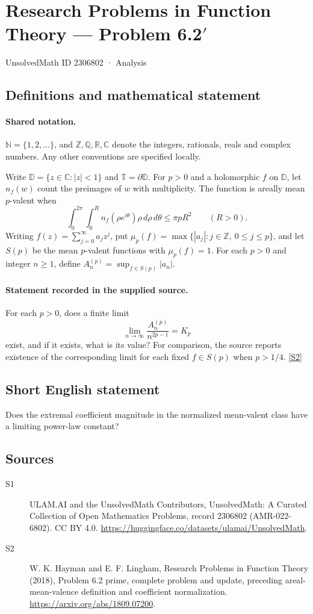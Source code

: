 \documentclass[11pt]{article}
\newcommand{\sref}[2]{\hyperlink{source:#1:#2}{[S#2]}}
\begin{document}
\setcounter{section}{2306801}
\section{Research Problems in Function Theory — Problem 6.2$\prime$}\label{2306802}
{\small\sffamily UnsolvedMath ID 2306802 · Analysis}
\subsection{Definitions and mathematical statement}

\paragraph{Shared notation.}$\mathbb N=\{1,2,\ldots\}$, and $\mathbb Z,\mathbb Q,\mathbb R,\mathbb C$ denote the integers, rationals, reals and complex numbers. Any other conventions are specified locally.


Write $\mathbb D=\{z\in\mathbb C:|z|<1\}$ and $\mathbb T=\partial\mathbb D$. For $p>0$ and a holomorphic $f$ on $\mathbb D$, let $n_f(w)$ count the preimages of $w$ with multiplicity. The function is areally mean $p$-valent when
\[\int_0^{2\pi}\int_0^R n_f(\rho e^{i\theta})\rho\,d\rho\,d\theta\leq\pi pR^2\qquad(R>0).\]
Writing $f(z)=\sum_{j=0}^{\infty}a_jz^j$, put $\mu_p(f)=\max\{|a_j|:j\in\mathbb Z,\ 0\leq j\leq p\}$, and let $S(p)$ be the mean $p$-valent functions with $\mu_p(f)=1$.
For each $p>0$ and integer $n\geq1$, define $A_n^{(p)}=\sup_{f\in S(p)}|a_n|$.
\paragraph{Statement recorded in the supplied source.}
For each $p>0$, does a finite limit
\[\lim_{n\to\infty}\frac{A_n^{(p)}}{n^{2p-1}}=K_p\]
exist, and if it exists, what is its value? For comparison, the source reports existence of the corresponding limit for each fixed $f\in S(p)$ when $p>1/4$. \sref{2306802}{2}
\subsection{Short English statement}
Does the extremal coefficient magnitude in the normalized mean-valent class have a limiting power-law constant?
\subsection{Sources}
\begin{description}
\item[\hypertarget{source:2306802:1}{S1}] ULAM.AI and the UnsolvedMath Contributors, UnsolvedMath: A Curated Collection of Open Mathematics Problems, record 2306802 (AMR-022-6802). CC BY 4.0. \url{https://huggingface.co/datasets/ulamai/UnsolvedMath}.
\item[\hypertarget{source:2306802:2}{S2}] W. K. Hayman and E. F. Lingham, Research Problems in Function Theory (2018), Problem 6.2 prime, complete problem and update, preceding areal-mean-valence definition and coefficient normalization. \url{https://arxiv.org/abs/1809.07200}.
\end{description}
\label{end:2306802}
\end{document}
